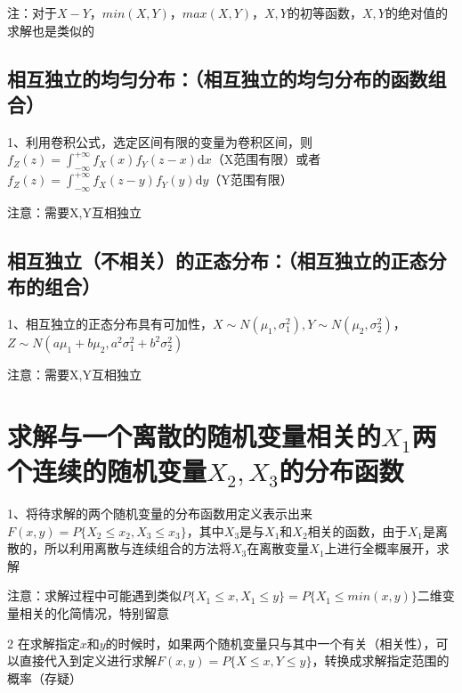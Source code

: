 注：对于$X-Y$，$min(X,Y)$，$max(X,Y)$，$X,Y$的初等函数，$X,Y$的绝对值的求解也是类似的



\subsection{相互独立的均匀分布：（相互独立的均匀分布的函数组合）}

1、利用卷积公式，选定区间有限的变量为卷积区间，则$f_{Z}(z)=\int_{-\infty}^{+\infty} f_{X}(x) f_{Y}(z-x) \mathrm{d} x$（X范围有限）或者$f_{Z}(z)=\int_{-\infty}^{+\infty} f_{X}(z-y) f_{Y}(y) \mathrm{d} y$（Y范围有限）

注意：需要X,Y互相独立



\subsection{相互独立（不相关）的正态分布：（相互独立的正态分布的组合）}

1、相互独立的正态分布具有可加性，$X \sim{N}\left(\mu_{1}, \sigma_{1}^{2}\right), Y \sim N\left(\mu_{2}, \sigma_{2}^{2}\right)$，$Z \sim N\left(a\mu_{1}+b\mu_{2}, a^2\sigma_{1}^{2}+b^2\sigma_{2}^{2}\right)$

注意：需要X,Y互相独立

\section{求解与一个离散的随机变量相关的$X_1$两个连续的随机变量$X_2,X_3$的分布函数}

1、将待求解的两个随机变量的分布函数用定义表示出来$F(x,y)=P\{ X_2 \le x_2, X_3 \le x_3 \}$，其中$X_3$是与$X_1$和$X_2$相关的函数，由于$X_1$是离散的，所以利用离散与连续组合的方法将$X_3$在离散变量$X_1$上进行全概率展开，求解

注意：求解过程中可能遇到类似$P\{ X_1\le x,X_1\le y \} = P\{ X_1 \le min(x,y) \}$二维变量相关的化简情况，特别留意



2 在求解指定$x$和$y$的时候时，如果两个随机变量只与其中一个有关（相关性），可以直接代入到定义进行求解$F(x,y)=P\{ X \le x, Y \le y \}$，转换成求解指定范围的概率（存疑）

